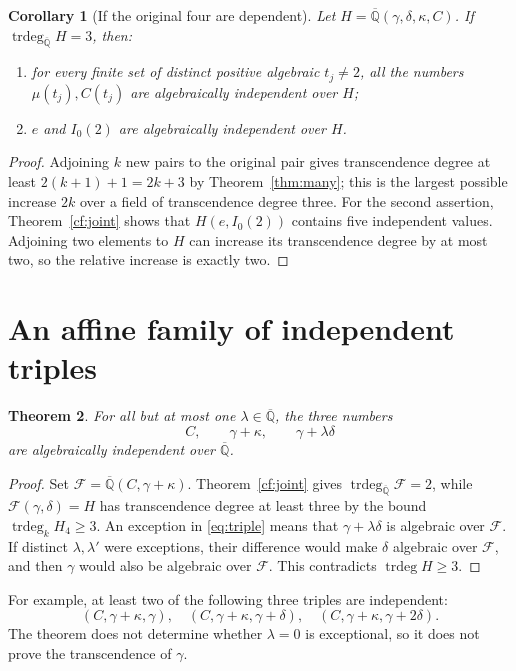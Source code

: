 \documentclass[11pt]{article}
\newtheorem{theorem}{Theorem}[section]
\newtheorem{corollary}[theorem]{Corollary}
\theoremstyle{definition}
\theoremstyle{remark}
\newcommand{\Qa}{\overline{\mathbb Q}}
\newcommand{\trdeg}{\operatorname{trdeg}}
\begin{document}
\begin{corollary}[If the original four are dependent]\label{cor:relative}
Let $H=\Qa(\gamma,\delta,\kappa,C)$. If $\trdeg_{\Qa}H=3$, then:
\begin{enumerate}
\item for every finite set of distinct positive algebraic $t_j\ne2$,
all the numbers $\mu(t_j),C(t_j)$ are algebraically independent over $H$;
\item $e$ and $I_0(2)$ are algebraically independent over $H$.
\end{enumerate}
\end{corollary}
\begin{proof}
Adjoining $k$ new pairs to the original pair gives transcendence degree
at least $2(k+1)+1=2k+3$ by Theorem~\ref{thm:many}; this is the largest
possible increase $2k$ over a field of transcendence degree three.
For the second assertion, Theorem~\ref{cf:joint} shows that
$H(e,I_0(2))$ contains five independent values. Adjoining two elements
to $H$ can increase its transcendence degree by at most two, so the
relative increase is exactly two.
\end{proof}

\section{An affine family of independent triples}
\begin{theorem}\label{thm:affine}
For all but at most one $\lambda\in\Qa$, the three numbers
\begin{equation}\label{eq:triple}
C,\qquad \gamma+\kappa,\qquad \gamma+\lambda\delta
\end{equation}
are algebraically independent over $\Qa$.
\end{theorem}
\begin{proof}
Set $\mathcal F=\Qa(C,\gamma+\kappa)$. Theorem~\ref{cf:joint} gives
$\trdeg_{\Qa}\mathcal F=2$, while
$\mathcal F(\gamma,\delta)=H$ has transcendence degree at least three by
the bound $\operatorname{trdeg}_kH_4\ge3$. An exception in \eqref{eq:triple} means that
$\gamma+\lambda\delta$ is algebraic over $\mathcal F$. If distinct
$\lambda,\lambda'$ were exceptions, their difference would make
$\delta$ algebraic over $\mathcal F$, and then $\gamma$ would also be algebraic
over $\mathcal F$. This contradicts $\trdeg H\ge3$.
\end{proof}

For example, at least two of the following three triples are independent:
\[
(C,\gamma+\kappa,\gamma),\quad
(C,\gamma+\kappa,\gamma+\delta),\quad
(C,\gamma+\kappa,\gamma+2\delta).
\]
The theorem does not determine whether $\lambda=0$ is exceptional, so it
does not prove the transcendence of $\gamma$.
\end{document}
